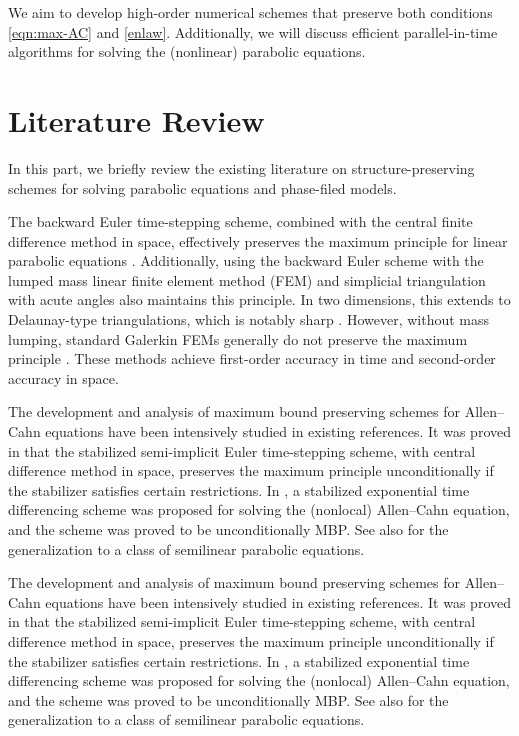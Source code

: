 \documentclass[a4paper, oneside]{book}
\begin{document}
We aim to develop high-order numerical schemes that preserve both conditions \eqref{eqn:max-AC} and \eqref{enlaw}. Additionally, we will discuss efficient parallel-in-time algorithms for solving the (nonlinear) parabolic equations.

\section{Literature Review} 

In this part, we briefly review the existing literature on structure-preserving schemes for solving parabolic equations and phase-filed models.

The backward Euler time-stepping scheme, combined with the central finite difference method in space, effectively preserves the maximum principle for linear parabolic equations \cite[Chapter 9]{Larsson-Thomee-2003}. Additionally, using the backward Euler scheme with the lumped mass linear finite element method (FEM) and simplicial triangulation with acute angles also maintains this principle. In two dimensions, this extends to Delaunay-type triangulations, which is notably sharp \cite{Thomee:2008}. However, without mass lumping, standard Galerkin FEMs generally do not preserve the maximum principle \cite{Thomee:2008, Schatz:2010}. These methods achieve first-order accuracy in time and second-order accuracy in space.

The development and analysis of maximum bound preserving schemes for Allen--Cahn equations have been intensively studied in existing references.
It was proved in \cite{tangyang1,ShenTangYang:2016} that the stabilized semi-implicit Euler time-stepping scheme,
with central difference method in space, preserves the maximum principle unconditionally
if the stabilizer satisfies certain restrictions. In \cite{DuJuLiQiao:2019},
a stabilized exponential time differencing scheme was proposed for solving the (nonlocal) Allen--Cahn equation,
and the scheme was proved to be unconditionally MBP. See also \cite{DuJuLiQiao:2020}
for the generalization to a class of semilinear parabolic equations.

The development and analysis of maximum bound preserving schemes for Allen--Cahn equations have been intensively studied in existing references.
It was proved in \cite{tangyang1,ShenTangYang:2016} that the stabilized semi-implicit Euler time-stepping scheme,
with central difference method in space, preserves the maximum principle unconditionally
if the stabilizer satisfies certain restrictions. In \cite{DuJuLiQiao:2019},
a stabilized exponential time differencing scheme was proposed for solving the (nonlocal) Allen--Cahn equation,
and the scheme was proved to be unconditionally MBP. See also \cite{DuJuLiQiao:2020}
for the generalization to a class of semilinear parabolic equations.
\end{document}
